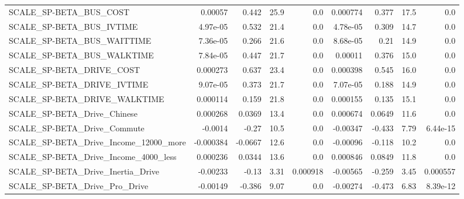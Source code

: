 \begin{tabular}{lrrrrrrrr}
SCALE\_SP-BETA\_BUS\_COST                             &     0.00057 &        0.442 &     25.9 &      0.0 &   0.000774 &       0.377 &         17.5 &           0.0 \\
SCALE\_SP-BETA\_BUS\_IVTIME                           &    4.97e-05 &        0.532 &     21.4 &      0.0 &   4.78e-05 &       0.309 &         14.7 &           0.0 \\
SCALE\_SP-BETA\_BUS\_WAITTIME                         &    7.36e-05 &        0.266 &     21.6 &      0.0 &   8.68e-05 &        0.21 &         14.9 &           0.0 \\
SCALE\_SP-BETA\_BUS\_WALKTIME                         &    7.84e-05 &        0.447 &     21.7 &      0.0 &    0.00011 &       0.376 &         15.0 &           0.0 \\
SCALE\_SP-BETA\_DRIVE\_COST                           &    0.000273 &        0.637 &     23.4 &      0.0 &   0.000398 &       0.545 &         16.0 &           0.0 \\
SCALE\_SP-BETA\_DRIVE\_IVTIME                         &    9.07e-05 &        0.373 &     21.7 &      0.0 &   7.07e-05 &       0.188 &         14.9 &           0.0 \\
SCALE\_SP-BETA\_DRIVE\_WALKTIME                       &    0.000114 &        0.159 &     21.8 &      0.0 &   0.000155 &       0.135 &         15.1 &           0.0 \\
SCALE\_SP-BETA\_Drive\_Chinese                        &    0.000268 &       0.0369 &     13.4 &      0.0 &   0.000674 &      0.0649 &         11.6 &           0.0 \\
SCALE\_SP-BETA\_Drive\_Commute                        &     -0.0014 &        -0.27 &     10.5 &      0.0 &   -0.00347 &      -0.433 &         7.79 &      6.44e-15 \\
SCALE\_SP-BETA\_Drive\_Income\_12000\_more              &   -0.000384 &      -0.0667 &     12.6 &      0.0 &   -0.00096 &      -0.118 &         10.2 &           0.0 \\
SCALE\_SP-BETA\_Drive\_Income\_4000\_less               &    0.000236 &       0.0344 &     13.6 &      0.0 &   0.000846 &      0.0849 &         11.8 &           0.0 \\
SCALE\_SP-BETA\_Drive\_Inertia\_Drive                  &    -0.00233 &        -0.13 &     3.31 & 0.000918 &   -0.00565 &      -0.259 &         3.45 &      0.000557 \\
SCALE\_SP-BETA\_Drive\_Pro\_Drive                      &    -0.00149 &       -0.386 &     9.07 &      0.0 &   -0.00274 &      -0.473 &         6.83 &      8.39e-12 \\

\end{tabular}

